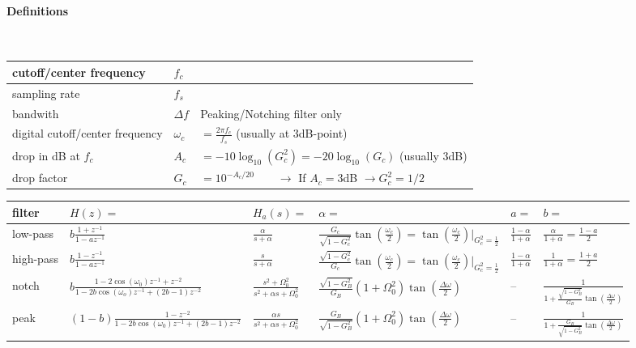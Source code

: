\paragraph{Definitions}~\\
\begin{tabular}{|l|l|l|}
	\hline
	cutoff/center frequency & $f_c$ &
	\\ \hline
	sampling rate & $f_s$ &
	\\ \hline
	bandwith & $\Delta f$ & Peaking/Notching filter only
	\\ \hline
	digital cutoff/center frequency & $\omega_c$ & $ = \frac{2\pi f_c}{f_s}$ \qquad (usually at 3dB-point)
	\\ \hline
	drop in dB at $f_c$ & $A_c$ & $= -10\log_{10}(G_c^2) = -20\log_{10}(G_c)$ \qquad (usually 3dB)
	\\ \hline
	drop factor & $G_c$ & $=10^{-A_c/20} \qquad \longrightarrow $ If $A_c = 3$dB $\rightarrow G_c^2 = 1/2$
	\\ \hline
\end{tabular}
\vfill
\begin{tabularx}{\textwidth}{|X|l|l|l|l|l|}
	\hline
	\textbf{filter} & $H(z) = $ & $H_a(s) = $ & $\alpha = $ & $a=$ & $b=$
	\\ \hline
	low-pass	&
	$b\frac{1 + z^{-1}}{1 - a z^{-1}}$ &
	$\frac{\alpha}{s + \alpha}$	&
	$ \frac{G_c}{\sqrt{1-G_c^2}}\tan\left(\frac{\omega_c}{2}\right)
	= \tan\left(\frac{\omega_c}{2}\right)\vert_{G_c^2 = \frac{1}{2}}$&
	$\frac{1 - \alpha}{1 + \alpha}$ &
	$\frac{\alpha}{1 + \alpha} = \frac{1 - a}{2}$
	\\ \hline
	high-pass &
	$b\frac{1 - z^{-1}}{1 - a z^{-1}}$ &
	$\frac{s}{s + \alpha}$ &
	$\frac{\sqrt{1-G_c^2}}{G_c}\tan\left(\frac{\omega_c}{2}\right)
	=\tan\left(\frac{\omega_c}{2}\right)\vert_{G_c^2 = \frac{1}{2}}$&
	$\frac{1-\alpha}{1+\alpha}$&
	$\frac{1}{1+\alpha} = \frac{1 + a}{2}$
	\\ \hline
	notch &
	$b\frac{1-2\cos(\omega_0) z^{-1} + z^{-2}}{1 -2b \cos(\omega_o) z^{-1} + (2b-1)z^{-2}}$&
	$\frac{s^2 + \Omega_0^2}{s^2+\alpha s + \Omega_0^2}$&
	$\frac{\sqrt{1-G_B^2}}{G_B}(1+\Omega_0^2)\tan\left(\frac{\Delta\omega}{2}\right)$&
	--&
	$\frac{1}{1+\frac{\sqrt{1-G_B^2}}{G_B}\tan\left(\frac{\Delta\omega}{2}\right)}$
	\\ \hline
	peak &
	$(1-b)\frac{1-z^{-2}}{1-2b\cos(\omega_0)z^{-1} + (2b-1)z^{-2}}$&
	$\frac{\alpha s}{s^2 + \alpha s + \Omega_0^2}$&
	$\frac{G_B}{\sqrt{1-G_B^2}}(1+\Omega_0^2)\tan\left(\frac{\Delta\omega}{2}\right)$&
	--&
	$\frac{1}{1+\frac{G_B}{\sqrt{1-G_B^2}}\tan\left(\frac{\Delta\omega}{2}\right)}$
	\\ \hline
\end{tabularx}

